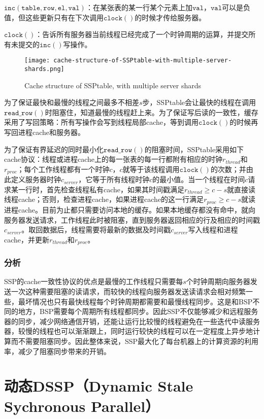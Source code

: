 \documentclass[11pt]{article}
\begin{document}
    \textbullet $\mathtt{inc(table, row, el, val)}$：在某张表的某一行某个元素上加$\mathtt{val}$，$\mathtt{val}$可以是负值，但这些更新只有在下次调用$\mathtt{clock()}$的时候才传给服务器。

    \textbullet $\mathtt{clock()}$：告诉所有服务器当前线程已经完成了一个时钟周期的运算，并提交所有未提交的$\mathtt{inc()}$写操作。
    \begin{figure}[H]
        \centering
        \texttt{[image: cache-structure-of-SSPtable-with-multiple-server-shards.png]}
        \caption{Cache structure of SSPtable, with multiple server shards}
    \end{figure}
    为了保证最快和最慢的线程之间最多不相差$s$步，SSPtable会让最快的线程在调用$\mathtt{read\_row()}$时阻塞住，知道最慢的线程赶上来。为了保证写后读的一致性，缓存采用了写回策略：所有写操作会写到线程局部cache，等到调用$\mathtt{clock()}$的时候再写回进程cache和服务器。

    为了保证有界延迟的同时最小化$\mathtt{read\_row()}$的阻塞时间，SSPtable采用如下cache协议：线程或进程cache上的每一张表的每一行都附有相应的时钟$r_{thread}$和$r_{proc}$；每个工作线程都有一个时钟$c$，$c$就等于该线程调用$\mathtt{clock()}$的次数；并由此定义服务器时钟$c_{server}$，它等于所有线程时钟$c$的最小值。当一个线程在时间$c$请求某一行时，首先检查线程私有cache，如果其时间戳满足$r_{thread} \geq c-s$就直接读线程cache；否则，检查进程cache，如果进程cache的这一行满足$r_{proc} \geq c-s$就读进程cache。目前为止都只需要访问本地的缓存。如果本地缓存都没有命中，就向服务器发送请求，工作线程此时被阻塞，直到服务器返回相应的行及相应的时间戳$c_{server}$。取回数据后，线程需要将最新的数据及时间戳$c_{server}$写入线程和进程cache，并更新$r_{thread}$和$r_{proc}$。

    \subsubsection{分析}
    SSP的cache一致性协议的优点是最慢的工作线程只需要每$s$个时钟周期向服务器发送一次这种需要阻塞的读请求，而较快的线程向服务器发送读请求会相对频繁一些，最坏情况也只有最快线程每个时钟周期都需要和最慢线程同步。这是和BSP不同的地方，BSP需要每个周期所有线程都同步。因此SSP不仅能够减少和远程服务器的同步，减少网络通信开销，还能让运行比较慢的线程避免在一些迭代中读服务器，较慢的线程也可以渐渐跟上，同时运行较快的线程可以在一定程度上异步地计算而不需要阻塞同步。因此整体来说，SSP最大化了每台机器上的计算资源的利用率，减少了阻塞同步带来的开销。


    \section{动态DSSP（Dynamic Stale Sychronous Parallel）}
\end{document}
